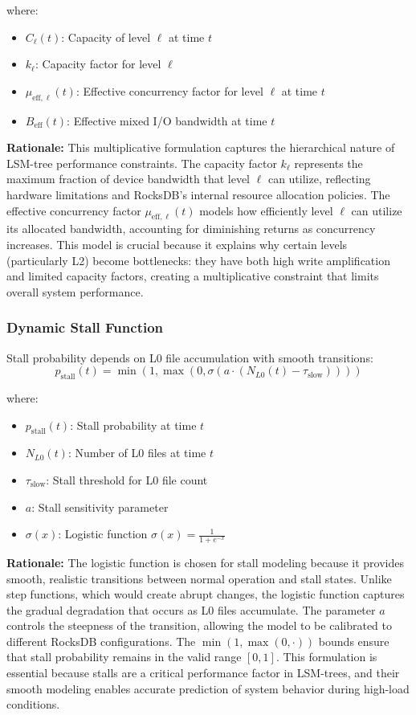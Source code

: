 \documentclass[11pt]{article}
\newcommand{\pstall}{p_{\text{stall}}}
\begin{document}
where:
\begin{itemize}
    \item $C_\ell(t)$: Capacity of level $\ell$ at time $t$
    \item $k_\ell$: Capacity factor for level $\ell$
    \item $\mu_{\text{eff},\ell}(t)$: Effective concurrency factor for level $\ell$ at time $t$
    \item $B_{\text{eff}}(t)$: Effective mixed I/O bandwidth at time $t$
\end{itemize}

\textbf{Rationale:} This multiplicative formulation captures the hierarchical nature of LSM-tree performance constraints. The capacity factor $k_\ell$ represents the maximum fraction of device bandwidth that level $\ell$ can utilize, reflecting hardware limitations and RocksDB's internal resource allocation policies. The effective concurrency factor $\mu_{\text{eff},\ell}(t)$ models how efficiently level $\ell$ can utilize its allocated bandwidth, accounting for diminishing returns as concurrency increases. This model is crucial because it explains why certain levels (particularly L2) become bottlenecks: they have both high write amplification and limited capacity factors, creating a multiplicative constraint that limits overall system performance.

\subsubsection{Dynamic Stall Function}
Stall probability depends on L0 file accumulation with smooth transitions:
\begin{equation}
\pstall(t) = \min(1, \max(0, \sigma(a \cdot (N_{L0}(t) - \tau_{\text{slow}}))))
\end{equation}

where:
\begin{itemize}
    \item $p_{\text{stall}}(t)$: Stall probability at time $t$
    \item $N_{L0}(t)$: Number of L0 files at time $t$
    \item $\tau_{\text{slow}}$: Stall threshold for L0 file count
    \item $a$: Stall sensitivity parameter
    \item $\sigma(x)$: Logistic function $\sigma(x) = \frac{1}{1 + e^{-x}}$
\end{itemize}

\textbf{Rationale:} The logistic function is chosen for stall modeling because it provides smooth, realistic transitions between normal operation and stall states. Unlike step functions, which would create abrupt changes, the logistic function captures the gradual degradation that occurs as L0 files accumulate. The parameter $a$ controls the steepness of the transition, allowing the model to be calibrated to different RocksDB configurations. The $\min(1, \max(0, \cdot))$ bounds ensure that stall probability remains in the valid range $[0,1]$. This formulation is essential because stalls are a critical performance factor in LSM-trees, and their smooth modeling enables accurate prediction of system behavior during high-load conditions.
\end{document}

